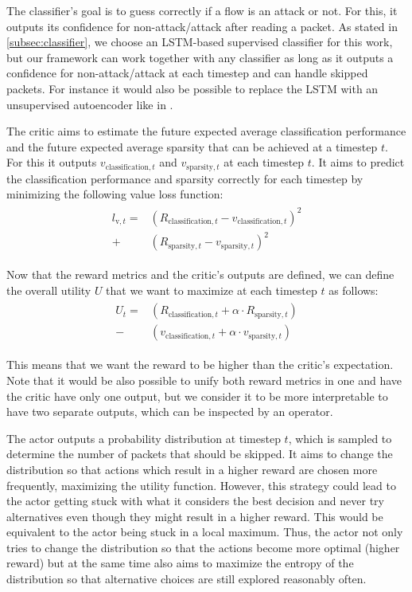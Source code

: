 \documentclass[conference]{IEEEtran}
\begin{document}
The classifier's goal is to guess correctly if a flow is an attack or not. For this, it outputs its confidence for non-attack/attack after reading a packet. As stated in \autoref{subsec:classifier}, we choose an LSTM-based supervised classifier for this work, but our framework can work together with any classifier as long as it outputs a confidence for non-attack/attack at each timestep and can handle skipped packets. For instance it would also be possible to replace the LSTM with an unsupervised autoencoder like in \cite{mirsky_kitsune_2018}.

The critic aims to estimate the future expected average classification performance and the future expected average sparsity that can be achieved at a timestep $t$. For this it outputs $v_{\text{classification},t}$ and $v_{\text{sparsity},t}$ at each timestep $t$. It aims to predict the classification performance and sparsity correctly for each timestep by minimizing the following value loss function:
\begin{align}
\begin{split}
l_{\text{v},t} =& \left(R_{\text{classification},t} - v_{\text{classification},t}\right)^2 \\
+ & \left(R_{\text{sparsity},t} - v_{\text{sparsity},t}\right)^2
\end{split}
\end{align}

Now that the reward metrics and the critic's outputs are defined, we can define the overall utility $U$ that we want to maximize at each timestep $t$ as follows:
\begin{align}
\begin{split}
U_t =& \left(R_{\text{classification},t} + \alpha \cdot R_{\text{sparsity},t}\right) \\
- & \left(v_{\text{classification},t} + \alpha \cdot v_{\text{sparsity},t}\right)
\end{split}
\end{align}

This means that we want the reward to be higher than the critic's expectation. Note that it would be also possible to unify both reward metrics in one and have the critic have only one output, but we consider it to be more interpretable to have two separate outputs, which can be inspected by an operator.

The actor outputs a probability distribution at timestep $t$, which is sampled to determine the number of packets that should be skipped. It aims to change the distribution so that actions which result in a higher reward are chosen more frequently, maximizing the utility function. However, this strategy could lead to the actor getting stuck with what it considers the best decision and never try alternatives even though they might result in a higher reward. This would be equivalent to the actor being stuck in a local maximum. Thus, the actor not only tries to change the distribution so that the actions become more optimal (higher reward) but at the same time also aims to maximize the entropy of the distribution so that alternative choices are still explored reasonably often.
\end{document}
